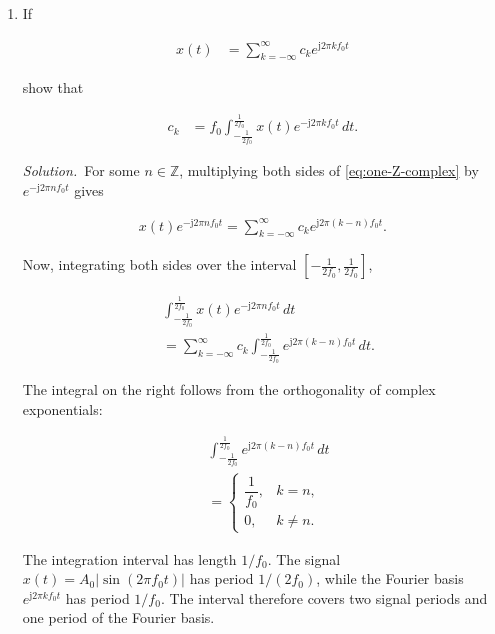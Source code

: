 \documentclass[journal,12pt,twocolumn]{IEEEtran}
\renewcommand\thesection{\arabic{section}}
\newcommand{\jj}{\mathrm{j}}
\providecommand{\solution}{\par\noindent\textit{Solution.}\ }
\begin{document}
\begin{enumerate}[
    label=\thesection.\arabic*,
    ref=\thesection.\theenumi
]

\item If

\begin{align}
    x(t)
    &= \sum_{k=-\infty}^{\infty}
    c_ke^{\jj2\pi kf_0t}
    \label{eq:one-Z-complex}
\end{align}

show that

\begin{align}
    c_k
    &= f_0\int_{-\frac{1}{2f_0}}^{\frac{1}{2f_0}}
    x(t)e^{-\jj2\pi kf_0t}\,dt.
    \label{eq:one-Z}
\end{align}

\solution For some $n\in\mathbb{Z}$, multiplying
both sides of \eqref{eq:one-Z-complex} by
$e^{-\jj2\pi nf_0t}$ gives

\begin{align}
    x(t)e^{-\jj2\pi nf_0t}
    =
    \sum_{k=-\infty}^{\infty}
    c_ke^{\jj2\pi(k-n)f_0t}.
\end{align}

Now, integrating both sides over the interval
$\left[-\frac{1}{2f_0},\frac{1}{2f_0}\right]$,

\begin{align}
    &\int_{-\frac{1}{2f_0}}^{\frac{1}{2f_0}}
    x(t)e^{-\jj2\pi nf_0t}\,dt
    \nonumber\\
    &=
    \sum_{k=-\infty}^{\infty}
    c_k
    \int_{-\frac{1}{2f_0}}^{\frac{1}{2f_0}}
    e^{\jj2\pi(k-n)f_0t}\,dt.
\end{align}

The integral on the right follows from the orthogonality of complex
exponentials:

\begin{align}
    &\int_{-\frac{1}{2f_0}}^{\frac{1}{2f_0}}
    e^{\jj2\pi(k-n)f_0t}\,dt
    \nonumber\\
    &=
    \begin{cases}
        \dfrac{1}{f_0}, & k=n,\\[4pt]
        0, & k\neq n.
    \end{cases}
\end{align}

The integration interval has length $1/f_0$. The signal
$x(t)=A_0|\sin(2\pi f_0t)|$ has period $1/(2f_0)$, while the
Fourier basis $e^{\jj2\pi kf_0t}$ has period $1/f_0$. The interval
therefore covers two signal periods and one period of the Fourier basis.


\end{enumerate}
\end{document}
